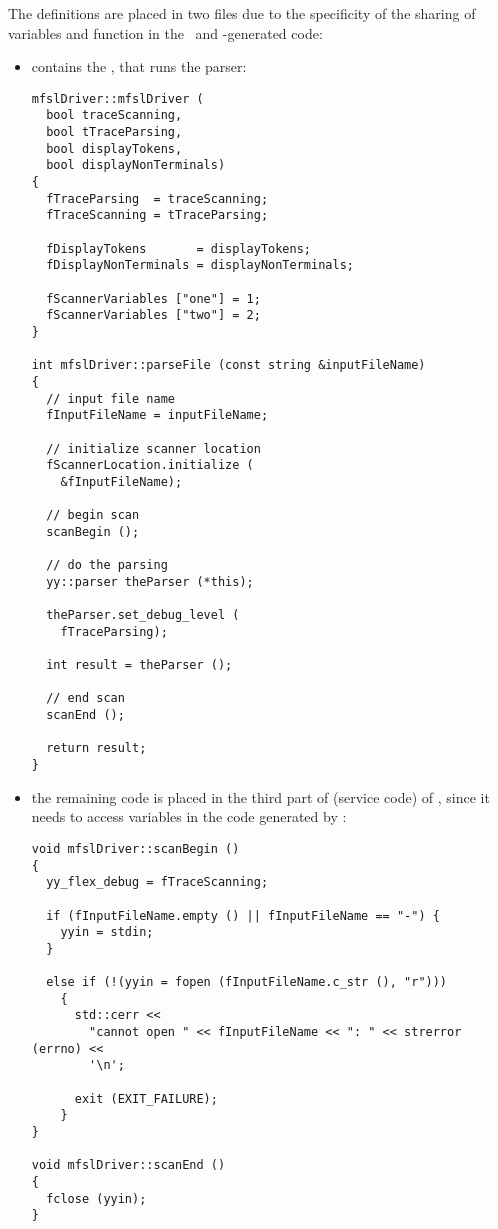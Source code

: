The definitions are placed in two files due to the specificity of the sharing of variables and function in the \flex\ and \bison-generated code:
\begin{itemize}

\item {} contains the  \constructor, that runs the parser:
\begin{lstlisting}[language=Terminal]
mfslDriver::mfslDriver (
  bool traceScanning,
  bool tTraceParsing,
  bool displayTokens,
  bool displayNonTerminals)
{
  fTraceParsing  = traceScanning;
  fTraceScanning = tTraceParsing;

  fDisplayTokens       = displayTokens;
  fDisplayNonTerminals = displayNonTerminals;

  fScannerVariables ["one"] = 1;
  fScannerVariables ["two"] = 2;
}

int mfslDriver::parseFile (const string &inputFileName)
{
  // input file name
  fInputFileName = inputFileName;

  // initialize scanner location
  fScannerLocation.initialize (
    &fInputFileName);

  // begin scan
  scanBegin ();

  // do the parsing
  yy::parser theParser (*this);

  theParser.set_debug_level (
    fTraceParsing);

  int result = theParser ();

  // end scan
  scanEnd ();

  return result;
}
\end{lstlisting}

\item the remaining code is placed in the third part of (service code) of , since it needs to access variables in the code generated by \flex:
\begin{lstlisting}[language=Terminal]
void mfslDriver::scanBegin ()
{
  yy_flex_debug = fTraceScanning;

  if (fInputFileName.empty () || fInputFileName == "-") {
    yyin = stdin;
  }

  else if (!(yyin = fopen (fInputFileName.c_str (), "r")))
    {
      std::cerr <<
        "cannot open " << fInputFileName << ": " << strerror (errno) <<
        '\n';

      exit (EXIT_FAILURE);
    }
}

void mfslDriver::scanEnd ()
{
  fclose (yyin);
}
\end{lstlisting}

\end{itemize}



